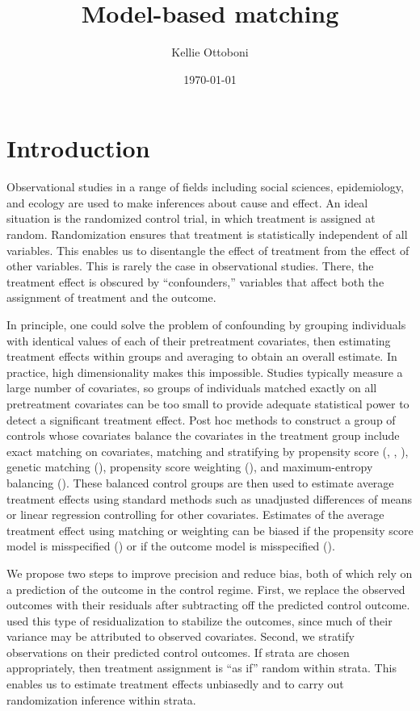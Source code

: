 \documentclass[12pt]{article}
\title{Model-based matching}
\author{Kellie Ottoboni}
\date{\today}
\begin{document}
\maketitle


\section{Introduction}

Observational studies in a range of fields including social sciences, epidemiology, and ecology are used to make inferences about cause and effect.  
An ideal situation is the randomized control trial, in which treatment is assigned at random.
Randomization ensures that treatment is statistically independent of all variables.
This enables us to disentangle the effect of treatment from the effect of other variables.
This is rarely the case in observational studies.
There, the treatment effect is obscured by ``confounders,'' variables that affect both the assignment of treatment and the outcome. 

In principle, one could solve the problem of confounding by grouping individuals with identical values of each of their pretreatment covariates, 
then estimating treatment effects within groups and averaging to obtain an overall estimate.
In practice, high dimensionality makes this impossible.
Studies typically measure a large number of covariates, so groups of individuals matched exactly on all pretreatment covariates can be too small to provide adequate statistical power to detect a significant treatment effect. 
Post hoc methods to construct a group of controls whose covariates balance the covariates in the treatment group include exact matching on covariates, matching and stratifying by propensity score (\cite{rosenbaum_central_1983}, \cite{austin_comparison_2014}, \cite{lunceford_stratification_2004}), genetic matching (\cite{diamond_genetic_2013}), propensity score weighting (\cite{hirano_efficient_2003}), and maximum-entropy balancing (\cite{hainmueller_entropy_2012}).  
These balanced control groups are then used to estimate average treatment effects using standard methods such as unadjusted differences of means or linear regression controlling for other covariates.  
Estimates of the average treatment effect using matching or weighting can be biased if the propensity score model is misspecified (\cite{drake_effects_1993})
or if the outcome model is misspecified (\cite{freedman_weighting_2008}).  

We propose two steps to improve precision and reduce bias, both of which rely on a prediction of the outcome in the control regime.
First, we replace the observed outcomes with their residuals after subtracting off the predicted control outcome.
\citet{rosenbaum_covariance_2002} used this type of residualization to stabilize the outcomes, since much of their variance may be attributed to observed covariates.
Second, we stratify observations on their predicted control outcomes.
If strata are chosen appropriately, then treatment assignment is ``as if'' random within strata.
This enables us to estimate treatment effects unbiasedly and to carry out randomization inference within strata. 
\end{document}
